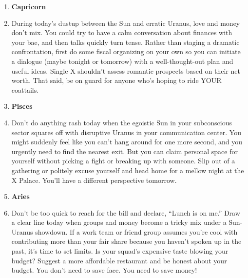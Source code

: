 \documentclass{article}[twocolumn]
\newcommand{\bb}[1]{\item[] \textbf{#1}}
\begin{document}
\begin{multicols}{2}
\begin{enumerate}
     \bb{Capricorn}
    \item During today’s dustup between the Sun and erratic Uranus, love and money don’t mix. You could try to have a calm conversation about finances with your bae, and then talks quickly turn tense. Rather than staging a dramatic confrontation, first do some fiscal organizing on your own so you can initiate a dialogue (maybe tonight or tomorrow) with a well-thought-out plan and useful ideas. Single X shouldn’t assess romantic prospects based on their net worth. That said, be on guard for anyone who’s hoping to ride YOUR coattails.
     \bb{Pisces}
    \item Don’t do anything rash today when the egoistic Sun in your subconscious sector squares off with disruptive Uranus in your communication center. You might suddenly feel like you can’t hang around for one more second, and you urgently need to find the nearest exit. But you can claim personal space for yourself without picking a fight or breaking up with someone. Slip out of a gathering or politely excuse yourself and head home for a mellow night at the X Palace. You’ll have a different perspective tomorrow.
     \bb{Aries}
    \item Don’t be too quick to reach for the bill and declare, “Lunch is on me.” Draw a clear line today when groups and money become a tricky mix under a Sun-Uranus showdown. If a work team or friend group assumes you’re cool with contributing more than your fair share because you haven’t spoken up in the past, it’s time to set limits. Is your squad’s expensive taste blowing your budget? Suggest a more affordable restaurant and be honest about your budget. You don’t need to save face. You need to save money!
\end{enumerate}


\end{multicols}
\end{document}
